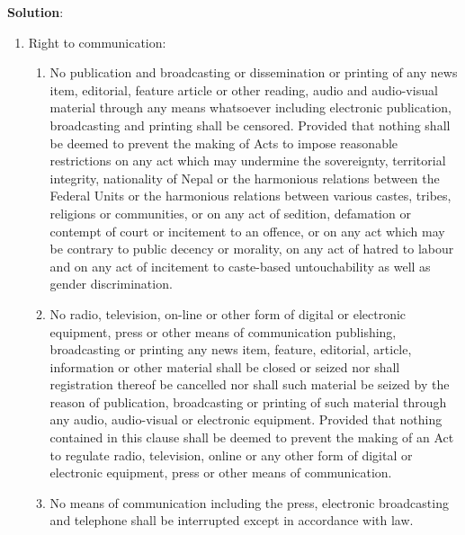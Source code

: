 \documentclass[
]{book}
\newenvironment{solution}{ {\bfseries Solution}:}{}
\begin{document}
\begin{questions}
\begin{solution}
\begin{enumerate}
\item Right to communication:
\begin{enumerate}
\item No publication and broadcasting or dissemination or printing of any news item, editorial, feature article or other reading, audio and audio-visual material through any means whatsoever including electronic publication, broadcasting and printing shall be censored. Provided that nothing shall be deemed to prevent the making of Acts to impose reasonable restrictions on any act which may undermine the sovereignty, territorial integrity, nationality of Nepal or the harmonious relations between the Federal Units or the harmonious relations between various castes, tribes, religions or communities, or on any act of sedition, defamation or contempt of court or incitement to an offence, or on any act which may be contrary to public decency or morality, on any act of hatred to labour and on any act of incitement to caste-based untouchability as well as gender discrimination.
\item No radio, television, on-line or other form of digital or electronic equipment, press or other means of communication publishing, broadcasting or printing any news item, feature, editorial, article, information or other material shall be closed or seized nor shall registration thereof be cancelled nor shall such material be seized by the reason of publication, broadcasting or printing of such material through any audio, audio-visual or electronic equipment. Provided that nothing contained in this clause shall be deemed to prevent the making of an Act to regulate radio, television, online or any other form of digital or electronic equipment, press or other means of communication.
\item No means of communication including the press, electronic broadcasting and telephone shall be interrupted except in accordance with law.
\end{enumerate}


\end{enumerate}
\end{solution}
\end{questions}
\end{document}
